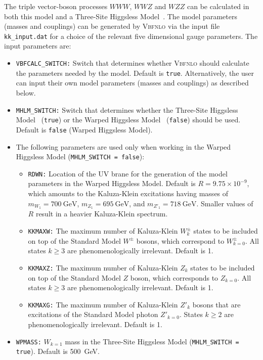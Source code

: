 \documentclass[english,12pt]{article}
\begin{document}
The triple vector-boson processes $WWW$, $WWZ$
and $WZZ$ can be calculated in both this model and a Three-Site Higgsless
Model~\cite{Chivukula:2006cg}. The model parameters (masses and couplings) can be generated by
\textsc{Vbfnlo} via the input file {\tt kk\_input.dat} for a choice
of the relevant five dimensional gauge parameters. The input parameters are: 
\begin{itemize}
\item {\tt VBFCALC\_SWITCH:} Switch that determines whether \textsc{Vbfnlo} should calculate
the  parameters needed by the model. Default is {\tt true}.  Alternatively, the user can input their own model parameters (masses and couplings) as described below.
\item {\tt MHLM\_SWITCH:} Switch that determines whether the Three-Site Higgsless
Model~\cite{Chivukula:2006cg} ({\tt true}) or the Warped Higgsless
Model~\cite{Csaki:2003zu} ({\tt false}) should be used. Default is
{\tt false} (Warped Higgsless Model).
\item The following parameters are used only when working in the Warped Higgsless Model ({\tt MHLM\_SWITCH = false}):
\begin{itemize}
\item  {\tt RDWN:} Location of the UV brane for the generation of the model
parameters in the Warped Higgsless Model. Default is $R=9.75\times 10^{-9}$,
which amounts to the Kaluza-Klein excitations having masses of
$m_{W_1}=700~\mathrm{GeV}$, $m_{Z_1}=695~\mathrm{GeV}$, and
$m_{Z'_1}=718~\mathrm{GeV}$. Smaller values of $R$ result in a heavier
Kaluza-Klein spectrum.
\item {\tt KKMAXW:} The maximum number of Kaluza-Klein $W^\pm_k$ states to be
included on top of the Standard Model $W^\pm$ bosons, which correspond to
$W^\pm_{k=0}$.    All states $k\geq 3$ are phenomenologically irrelevant.
Default is 1.
\item {\tt KKMAXZ:} The maximum number of Kaluza-Klein $Z_k$ states to be
included on top of the Standard Model $Z$ boson, which corresponds to $Z_{k=0}$.
All states $k\geq 3$ are phenomenologically irrelevant. Default is 1.
\item {\tt KKMAXG:} The maximum number of Kaluza-Klein $Z'_k$ bosons that are
excitations of the Standard Model photon $Z'_{k=0}$. States $k\geq 2$ are
phenomenologically irrelevant. Default is 1.
\end{itemize}
\item {\tt WPMASS:} $W_{k=1}$ mass in the Three-Site Higgsless Model ({\tt MHLM\_SWITCH = true}).  Default is 500~GeV.
\end{itemize}
\end{document}
